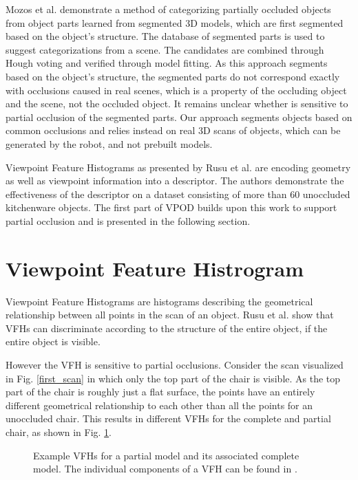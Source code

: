 \documentclass[letterpaper, 10pt, conference]{ieeeconf}
\begin{document}
Mozos et al. \cite{Mozos2011} demonstrate a method of categorizing partially occluded objects from object parts learned from segmented 3D models, which are first segmented based on the object's structure. The database of segmented parts is used to suggest categorizations from a scene. The candidates are combined through Hough voting and verified through model fitting. As this approach segments based on the object's structure, the segmented parts do not correspond exactly with occlusions caused in real scenes, which is a property of the occluding object and the scene, not the occluded object. It remains unclear whether \cite{Mozos2011} is sensitive to partial occlusion of the segmented parts. Our approach segments objects based on common occlusions and relies instead on real 3D scans of objects, which can be generated by the robot, and not prebuilt models.


Viewpoint Feature Histograms as presented by Rusu et al. \cite{Rusu2010} are encoding geometry as well as viewpoint information into a descriptor. The authors demonstrate the effectiveness of the descriptor on a dataset consisting of more than 60 unoccluded kitchenware objects. The first part of VPOD builds upon this work to support partial occlusion and is presented in the following section.



\section{Viewpoint Feature Histrogram}
\label{vfh}
Viewpoint Feature Histograms are histograms describing the geometrical
relationship between all points in the scan of an object. Rusu et al.
\cite{Rusu2010} show that VFHs can discriminate according to the structure of the entire object, if the entire object is visible.

However the VFH is sensitive to partial occlusions. Consider the scan
visualized in Fig. \ref{first_scan} in which only the top part of the chair is
visible. As the top part of the chair is roughly just a flat surface, the points
have an entirely different geometrical relationship to each other than all the
points for an unoccluded chair. This results in different VFHs for the complete
and partial chair, as shown in Fig. \ref{vfh-diff}. 

\begin{figure}[t]
	\centering 
   \vspace{-10pt}
   \centering
   \vspace{-10pt}
   \caption{Example VFHs for a partial model and its associated complete model.
   The individual components of a VFH can be found in \cite{Rusu2010}.}
   \label{vfh-diff}
   \vspace{-10pt}
\end{figure}
\end{document}
